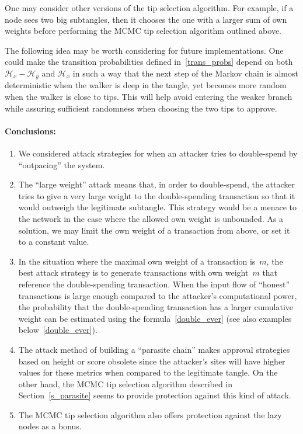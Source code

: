 \documentclass[12pt]{article}
\newcommand{\HH}{\mathcal{H}}
\begin{document}
One may consider other versions of the 
tip selection algorithm. For example, if a node sees
 two big subtangles, 
then it chooses the one with a larger sum of own weights 
before performing the MCMC tip selection algorithm outlined above.

The following idea may be worth considering for future implementations. 
One could make the transition probabilities defined 
in~\eqref{trans_probs} depend 
on both $\HH_x-\HH_y$ and $\HH_x$ in such a 
way that the next step of the Markov chain is almost deterministic
when the walker is deep in the tangle, yet becomes more 
random when the walker is close to tips. This will help avoid entering the 
weaker branch while assuring sufficient randomness when choosing the 
two tips to approve.



\paragraph{Conclusions:}
\begin{enumerate}
 \item We considered attack strategies for when an 
attacker tries to double-spend by ``outpacing'' the system.
 \item The ``large weight'' attack means that, in order to 
double-spend, the attacker tries to give a very large weight
to the double-spending transaction so that it would 
outweigh the legitimate subtangle. This strategy would be 
a menace to the network in the case where the allowed own weight is
unbounded. As a solution, we may limit the own weight
of a transaction from above, 
or set it to a constant value.
 \item In the situation where the maximal own weight
of a transaction is~$m$, the best attack strategy
is to generate transactions with own weight~$m$
that reference the double-spending transaction. 
When the input flow of ``honest''
transactions is large enough compared to the 
attacker's computational power, the probability
that the double-spending transaction
has a larger cumulative weight can be estimated
using the formula~\eqref{double_ever} (see also
examples below~\eqref{double_ever}).
 \item The attack method of building a ``parasite chain''
makes approval strategies based on height or score
obsolete since the attacker's sites will have higher values 
for these metrics when compared to the legitimate tangle. On the other hand,
the MCMC tip selection algorithm described in Section~\ref{s_parasite}
seems to provide protection against this kind of attack.
\item The MCMC tip selection algorithm also offers protection against 
the lazy nodes as a bonus.
\end{enumerate}
\end{document}
